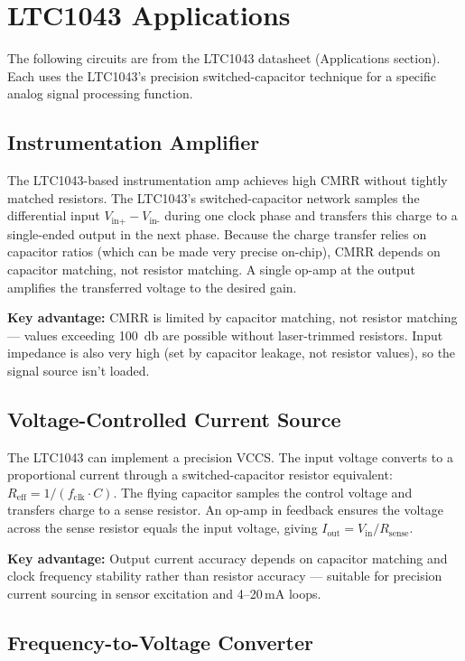 \section{LTC1043 Applications}

The following circuits are from the LTC1043 datasheet (Applications section). Each uses the LTC1043's precision switched-capacitor technique for a specific analog signal processing function.

\subsection{Instrumentation Amplifier}

The LTC1043-based instrumentation amp achieves high CMRR without tightly matched resistors. The LTC1043's switched-capacitor network samples the differential input $V_{\text{in+}} - V_{\text{in-}}$ during one clock phase and transfers this charge to a single-ended output in the next phase. Because the charge transfer relies on capacitor ratios (which can be made very precise on-chip), CMRR depends on capacitor matching, not resistor matching. A single op-amp at the output amplifies the transferred voltage to the desired gain.

\textbf{Key advantage:} CMRR is limited by capacitor matching, not resistor matching — values exceeding \SI{100}{\decibel} are possible without laser-trimmed resistors. Input impedance is also very high (set by capacitor leakage, not resistor values), so the signal source isn't loaded.

\subsection{Voltage-Controlled Current Source}

The LTC1043 can implement a precision VCCS. The input voltage converts to a proportional current through a switched-capacitor resistor equivalent: $R_{\text{eff}} = 1 / (f_{\text{clk}} \cdot C)$. The flying capacitor samples the control voltage and transfers charge to a sense resistor. An op-amp in feedback ensures the voltage across the sense resistor equals the input voltage, giving $I_{\text{out}} = V_{\text{in}} / R_{\text{sense}}$.

\textbf{Key advantage:} Output current accuracy depends on capacitor matching and clock frequency stability rather than resistor accuracy — suitable for precision current sourcing in sensor excitation and 4--20\,mA loops.

\subsection{Frequency-to-Voltage Converter}

